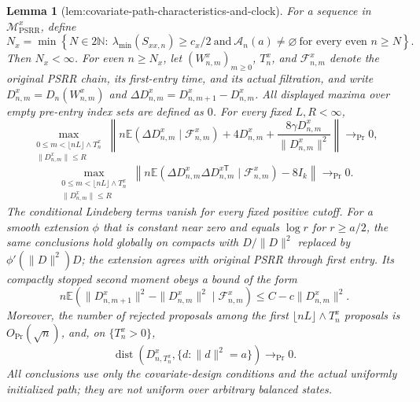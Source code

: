 \documentclass{article}
\newtheorem{lemma}{Lemma}
\begin{document}
\begin{lemma}[lem:covariate-path-characteristics-and-clock]\label{lem:covariate-path-characteristics-and-clock}
For a sequence in \(\mathcal M_{\mathrm{PSRR}}^{x}\), define
\[
 N_x=\min\left\{N\in2\mathbb N:\ \lambda_{\min}(S_{xx,n})\ge c_x/2\ \text{and}\ \mathcal A_n(a)\ne\varnothing\ \text{for every even }n\ge N\right\}.
\]
Then \(N_x<\infty\).  For even \(n\ge N_x\), let \((W^x_{n,m})_{m\ge0}\), \(T_n^x\), and \(\mathcal F^x_{n,m}\) denote the original PSRR chain, its first-entry time, and its actual filtration, and write \(D^x_{n,m}=D_n(W^x_{n,m})\) and \(\Delta D^x_{n,m}=D^x_{n,m+1}-D^x_{n,m}\).  All displayed maxima over empty pre-entry index sets are defined as \(0\).  For every fixed \(L,R<\infty\),
\[
 \max_{\substack{0\le m<\lfloor nL\rfloor\wedge T_n^x\\ \|D^x_{n,m}\|\le R}}
 \left\|n\mathbb E(\Delta D^x_{n,m}\mid\mathcal F^x_{n,m})+4D^x_{n,m}
 +\frac{8\gamma D^x_{n,m}}{\|D^x_{n,m}\|^2}\right\|\longrightarrow_{\Pr}0,
\]
\[
 \max_{\substack{0\le m<\lfloor nL\rfloor\wedge T_n^x\\ \|D^x_{n,m}\|\le R}}
 \left\|n\mathbb E(\Delta D^x_{n,m}\Delta D^{x\mathsf T}_{n,m}\mid\mathcal F^x_{n,m})-8I_k\right\|\longrightarrow_{\Pr}0.
\]
The conditional Lindeberg terms vanish for every fixed positive cutoff.  For a smooth extension \(\phi\) that is constant near zero and equals \(\log r\) for \(r\ge a/2\), the same conclusions hold globally on compacts with \(D/\|D\|^2\) replaced by \(\phi'(\|D\|^2)D\); the extension agrees with original PSRR through first entry.  Its compactly stopped second moment obeys a bound of the form
\[
 n\mathbb E\!\left(\|D^x_{n,m+1}\|^2-\|D^x_{n,m}\|^2\mid\mathcal F^x_{n,m}\right)
 \le C-c\|D^x_{n,m}\|^2.
\]
Moreover, the number of rejected proposals among the first \(\lfloor nL\rfloor\wedge T_n^x\) proposals is \(O_{\Pr}(\sqrt n)\), and, on \(\{T_n^x>0\}\),
\[
 \operatorname{dist}\!\left(D^x_{n,T_n^x},\{d:\|d\|^2=a\}\right)\longrightarrow_{\Pr}0.
\]
All conclusions use only the covariate-design conditions and the actual uniformly initialized path; they are not uniform over arbitrary balanced states.
\end{lemma}
\end{document}
